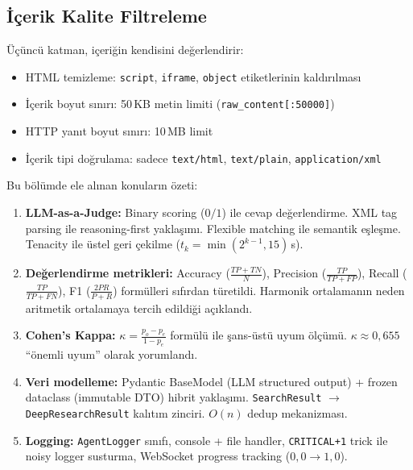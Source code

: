 \subsection{\.{I}\c{c}erik Kalite Filtreleme}

\"{U}\c{c}\"{u}nc\"{u} katman, i\c{c}eri\u{g}in kendisini de\u{g}erlendirir:

\begin{itemize}
  \item HTML temizleme: \texttt{script}, \texttt{iframe}, \texttt{object} etiketlerinin kald{\i}r{\i}lmas{\i}
  \item \.{I}\c{c}erik boyut s{\i}n{\i}r{\i}: 50\,KB metin limiti (\texttt{raw\_content[:50000]})
  \item HTTP yan{\i}t boyut s{\i}n{\i}r{\i}: 10\,MB limit
  \item \.{I}\c{c}erik tipi do\u{g}rulama: sadece \texttt{text/html}, \texttt{text/plain}, \texttt{application/xml}
\end{itemize}

\begin{ozet}
Bu b\"{o}l\"{u}mde ele al{\i}nan konular{\i}n \"{o}zeti:

\begin{enumerate}
  \item \textbf{LLM-as-a-Judge:} Binary scoring ($0/1$) ile cevap de\u{g}erlendirme. XML tag parsing ile reasoning-first yakla\c{s}{\i}m{\i}. Flexible matching ile semantik e\c{s}le\c{s}me. Tenacity ile \"{u}stel geri \c{c}ekilme ($t_k = \min(2^{k-1}, 15)$\,s).

  \item \textbf{De\u{g}erlendirme metrikleri:} Accuracy ($\frac{TP+TN}{N}$), Precision ($\frac{TP}{TP+FP}$), Recall ($\frac{TP}{TP+FN}$), F1 ($\frac{2PR}{P+R}$) form\"{u}lleri s{\i}f{\i}rdan t\"{u}retildi. Harmonik ortalaman{\i}n neden aritmetik ortalamaya tercih edildi\u{g}i a\c{c}{\i}kland{\i}.

  \item \textbf{Cohen's Kappa:} $\kappa = \frac{p_o - p_e}{1 - p_e}$ form\"{u}l\"{u} ile \c{s}ans-\"{u}st\"{u} uyum \"{o}l\c{c}\"{u}m\"{u}. $\kappa \approx 0{,}655$ ``\"{o}nemli uyum'' olarak yorumland{\i}.

  \item \textbf{Veri modelleme:} Pydantic BaseModel (LLM structured output) + frozen dataclass (immutable DTO) hibrit yakla\c{s}{\i}m{\i}. \texttt{SearchResult} $\to$ \texttt{DeepResearchResult} kal{\i}t{\i}m zinciri. $O(n)$ dedup mekanizmas{\i}.

  \item \textbf{Logging:} \texttt{AgentLogger} s{\i}n{\i}f{\i}, console + file handler, \texttt{CRITICAL+1} trick ile noisy logger susturma, WebSocket progress tracking ($0{,}0 \to 1{,}0$).
\end{enumerate}
\end{ozet}
